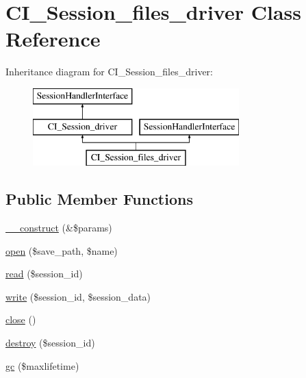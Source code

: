 \hypertarget{class_c_i___session__files__driver}{}\section{C\+I\+\_\+\+Session\+\_\+files\+\_\+driver Class Reference}
\label{class_c_i___session__files__driver}
Inheritance diagram for C\+I\+\_\+\+Session\+\_\+files\+\_\+driver\+:\begin{figure}[H]
\begin{center}
\leavevmode
\includegraphics[height=3.000000cm]{class_c_i___session__files__driver}
\end{center}
\end{figure}
\subsection*{Public Member Functions}
\begin{DoxyCompactItemize}
\item 
\mbox{\hyperlink{class_c_i___session__files__driver_ac1669c73d53d6f16cf5459a1e84d39c8}{\+\_\+\+\_\+construct}} (\&\$params)
\item 
\mbox{\hyperlink{class_c_i___session__files__driver_a614b5cf3840833913c7a73260ed28e02}{open}} (\$save\+\_\+path, \$name)
\item 
\mbox{\hyperlink{class_c_i___session__files__driver_a5bbf84ebf657be4eaccc0582377c76bf}{read}} (\$session\+\_\+id)
\item 
\mbox{\hyperlink{class_c_i___session__files__driver_ad9d124885be93668f1dbf6aace5964f5}{write}} (\$session\+\_\+id, \$session\+\_\+data)
\item 
\mbox{\hyperlink{class_c_i___session__files__driver_aa69c8bf1f1dcf4e72552efff1fe3e87e}{close}} ()
\item 
\mbox{\hyperlink{class_c_i___session__files__driver_aaec5812f6b4eb6835f88d3baa06a002a}{destroy}} (\$session\+\_\+id)
\item 
\mbox{\hyperlink{class_c_i___session__files__driver_a57aff7ee0656d8aa75d545fb8b3ae35d}{gc}} (\$maxlifetime)
\end{DoxyCompactItemize}
